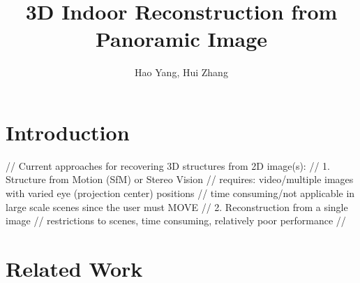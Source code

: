 \documentclass[runningheads]{llncs}
\begin{document}
\newcommand{\point}{
    \raise0.7ex\hbox{.}
    }


\pagestyle{headings}

\mainmatter

\title{3D Indoor Reconstruction from Panoramic Image} %



\author{Hao Yang, Hui Zhang} %

\maketitle

\begin{abstract}

\end{abstract}

\section{Introduction}

// Current approaches for recovering 3D structures from 2D image(s):
// 1. Structure from Motion (SfM) or Stereo Vision
//    requires: video/multiple images with varied eye (projection center) positions
//    time consuming/not applicable in large scale scenes since the user must MOVE
// 2. Reconstruction from a single image
//    restrictions to scenes, time consuming, relatively poor performance
// 

\section{Related Work}
\end{document}
